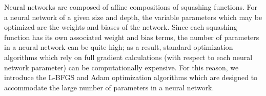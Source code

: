 Neural networks are composed of affine compositions of squashing functions. For a neural network of a given size and 
depth, the variable parameters which may be optimized are the weights and biases of the network. Since each squashing 
function has its own associated weight and bias terms, the number of parameters in a neural network can be quite high; 
as a result, standard optimization algorithms which rely on full gradient calculations (with respect to each neural 
network parameter) can be computationally expensive. For this reason, we introduce the L-BFGS\cite{Liu1989-sf} and Adam
\cite{kingma_adam_2014} optimization algorithms which are designed to accommodate the large number of parameters in a 
neural network.